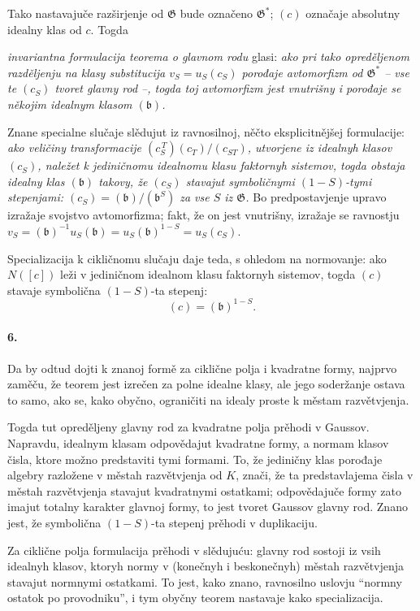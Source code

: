\documentclass[11pt]{article}
\begin{document}
Tako nastavajuče razširjenje od \(\mathfrak G\) bude označeno \(\mathfrak G^\ast\); \((c)\) označaje absolutny idealny klas od \(c\). Togda

\emph{invariantna formulacija teorema o glavnom rodu} glasi: \emph{ako pri tako opreděljenom razděljenju na klasy substitucija \(v_S=u_S(c_S)\) porođaje avtomorfizm od \(\mathfrak G^\ast\) -- vse te \((c_S)\) tvoret glavny rod --, togda toj avtomorfizm jest vnutrišny i porođaje se někojim idealnym klasom \((\mathfrak b)\).}

Znane specialne slučaje slědujut iz ravnosilnoj, něčto eksplicitnějšej formulacije: \emph{ako veličiny transformacije \((c_S^{\,T})(c_T)/(c_{ST})\), utvorjene iz idealnyh klasov \((c_S)\), naležet k jediničnomu idealnomu klasu faktornyh sistemov, togda obstaja idealny klas \((\mathfrak b)\) takovy, že \((c_S)\) stavajut symboličnymi \((1-S)\)-tymi stepenjami: \((c_S)=(\mathfrak b)/(\mathfrak b^{S})\) za vse \(S\) iz \(\mathfrak G\).} Bo predpostavjenje upravo izražaje svojstvo avtomorfizma; fakt, že on jest vnutrišny, izražaje se ravnostju \(v_S=(\mathfrak b)^{-1}u_S(\mathfrak b)=u_S(\mathfrak b)^{1-S}=u_S(c_S)\).

Specializacija k cikličnomu slučaju daje teda, s ohledom na normovanje: ako \(N([c])\) leži v jediničnom idealnom klasu faktornyh sistemov, togda \((c)\) stavaje symbolična \((1-S)\)-ta stepenj:
\[
(c)=(\mathfrak b)^{1-S}.
\]

\paragraph{6.}
Da by odtud dojti k znanoj formě za ciklične polja i kvadratne formy, najprvo zaměču, že teorem jest izrečen za polne idealne klasy, ale jego soderžanje ostava to samo, ako se, kako obyčno, ograničiti na idealy proste k městam razvětvjenja.

Togda tut opreděljeny glavny rod za kvadratne polja prěhodi v Gaussov. Napravdu, idealnym klasam odpovědajut kvadratne formy, a normam klasov čisla, ktore možno predstaviti tymi formami. To, že jediničny klas porođaje algebry razložene v městah razvětvjenja od \(K\), znači, že ta predstavlajema čisla v městah razvětvjenja stavajut kvadratnymi ostatkami; odpovědajuče formy zato imajut totalny karakter glavnoj formy, to jest tvoret Gaussov glavny rod. Znano jest, že symbolična \((1-S)\)-ta stepenj prěhodi v duplikaciju.

Za ciklične polja formulacija prěhodi v slědujuću: glavny rod sostoji iz vsih idealnyh klasov, ktoryh normy v (konečnyh i beskonečnyh) městah razvětvjenja stavajut normnymi ostatkami. To jest, kako znano, ravnosilno uslovju ``normny ostatok po provodniku'', i tym obyčny teorem nastavaje kako specializacija.
\end{document}
